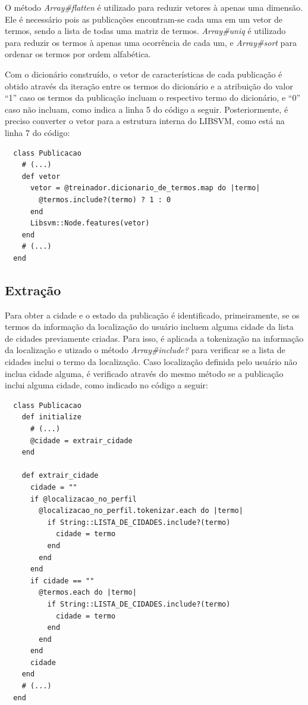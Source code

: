 O método \textit{Array\#flatten} é utilizado para reduzir vetores à apenas uma dimensão. Ele é necessário pois as publicações encontram-se cada uma em um vetor de termos, sendo a lista de todas uma matriz de termos. \textit{Array\#uniq} é utilizado para reduzir os termos à apenas uma ocorrência de cada um, e \textit{Array\#sort} para ordenar os termos por ordem alfabética.

Com o dicionário construído, o vetor de características de cada publicação é obtido através da iteração entre os termos do dicionário e a atribuição do valor ``1'' caso os termos da publicação incluam o respectivo termo do dicionário, e ``0'' caso não incluam, como indica a linha 5 do código a seguir. Posteriormente, é preciso converter o vetor para a estrutura interna do LIBSVM, como está na linha 7 do código:

\begin{lstlisting}
  class Publicacao
    # (...)
    def vetor
      vetor = @treinador.dicionario_de_termos.map do |termo| 
        @termos.include?(termo) ? 1 : 0
      end
      Libsvm::Node.features(vetor)
    end
    # (...)
  end
\end{lstlisting}

\subsection*{Extração}

Para obter a cidade e o estado da publicação é identificado, primeiramente, se os termos da informação da localização do usuário incluem alguma cidade da lista de cidades previamente criadas. Para isso, é aplicada a tokenização na informação da localização e utizado o método \textit{Array\#include?} para verificar se a lista de cidades inclui o termo da localização. Caso localização definida pelo usuário não inclua cidade alguma, é verificado através do mesmo método se a publicação inclui alguma cidade, como indicado no código a seguir:

\begin{lstlisting}
  class Publicacao
    def initialize
      # (...)
      @cidade = extrair_cidade
    end

    def extrair_cidade
      cidade = ""
      if @localizacao_no_perfil
        @localizacao_no_perfil.tokenizar.each do |termo|
          if String::LISTA_DE_CIDADES.include?(termo)
            cidade = termo
          end
        end
      end
      if cidade == ""
        @termos.each do |termo|
          if String::LISTA_DE_CIDADES.include?(termo)
            cidade = termo
          end
        end
      end
      cidade
    end
    # (...)
  end
\end{lstlisting}

